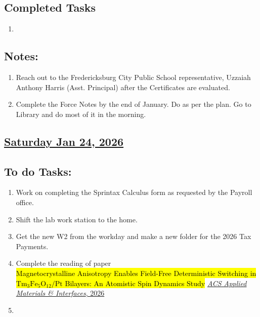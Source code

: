 \subsection*{Completed Tasks}
\begin{enumerate}[\ding{52}]  %
    \item 
\end{enumerate}
\subsection*{Notes:}
\begin{enumerate}
    \item Reach out to the Fredericksburg City Public School representative, Uzzaiah Anthony Harris (Asst. Principal) after the Certificates are evaluated.
    \item Complete the Force Notes by the end of January. Do as per the plan. Go to Library and do most of it in the morning.
\end{enumerate}
\subsection*{\underline{Saturday Jan 24, 2026} }
\subsection*{To do Tasks:}
\begin{enumerate}
    \item Work on completing the Sprintax Calculus form as requested by the Payroll office. \cmark
    \item Shift the lab work station to the home. 
    \cmark
    \item Get the new W2 from the workday and make a new folder for the 2026 Tax Payments. \cmark
    \item Complete the reading of paper \\ \hl{Magnetocrystalline Anisotropy Enables Field-Free Deterministic Switching in $\mathrm{Tm_3Fe_5O_{12}/Pt}$ Bilayers: An Atomistic Spin Dynamics Study} \href{https://doi.org/10.1021/acsami.5c23180}{\textit{ACS Applied Materials \& Interfaces}, 2026}
    \item 
\end{enumerate}

